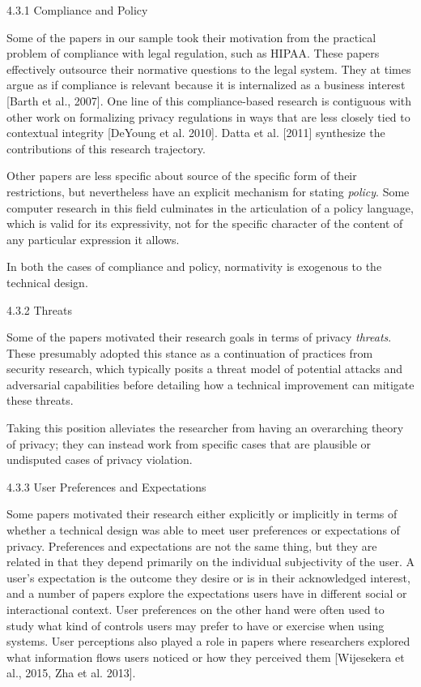 \documentclass[../thesis.tex]{subfiles}
\begin{document}
\bigskip

{\color[rgb]{0.4,0.4,0.4}
4.3.1 Compliance and Policy}

Some of the papers in our sample took their motivation from the
practical problem of compliance with legal regulation, such as HIPAA.
These papers effectively outsource their normative questions to the
legal system. They at times argue as if compliance is relevant because
it is internalized as a business interest [Barth et al., 2007]. One
line of this compliance-based research is contiguous with other work on
formalizing privacy regulations in ways that are less closely tied to
contextual integrity
[\textcolor[rgb]{0.13333334,0.13333334,0.13333334}{DeYoung et al.
2010]. Datta et al. [2011] synthesize the contributions of this
research trajectory.}


\bigskip

Other papers are less specific about source of the specific form of
their restrictions, but nevertheless have an explicit mechanism for
stating \textit{policy}. Some computer research in this field
culminates in the articulation of a policy language, which is valid for
its expressivity, not for the specific character of the content of any
particular expression it allows.


\bigskip

In both the cases of compliance and policy, normativity is exogenous to
the technical design. 

{\color[rgb]{0.4,0.4,0.4}
4.3.2 Threats}


\bigskip

Some of the papers motivated their research goals in terms of privacy
\textit{threats}. These presumably adopted this stance as a
continuation of practices from security research, which typically
posits a threat model of potential attacks and adversarial capabilities
before detailing how a technical improvement can mitigate these
threats. 


\bigskip

Taking this position alleviates the researcher from having an
overarching theory of privacy; they can instead work from specific
cases that are plausible or undisputed cases of privacy violation.

{\color[rgb]{0.4,0.4,0.4}
4.3.3 User Preferences and Expectations}


\bigskip

Some papers motivated their research either explicitly or implicitly in
terms of whether a technical design was able to meet user preferences
or expectations of privacy. Preferences and expectations are not the
same thing, but they are related in that they depend primarily on the
individual subjectivity of the user. A user's
expectation is the outcome they desire or is in their acknowledged
interest, and a number of papers explore the expectations users have in
different social or interactional context. User preferences on the
other hand were often used to study what kind of controls users may
prefer to have or exercise when using systems. User perceptions also
played a role in papers where researchers explored what information
flows users noticed or how they perceived them [Wijesekera et al.,
2015, Zha et al. 2013].
\end{document}
